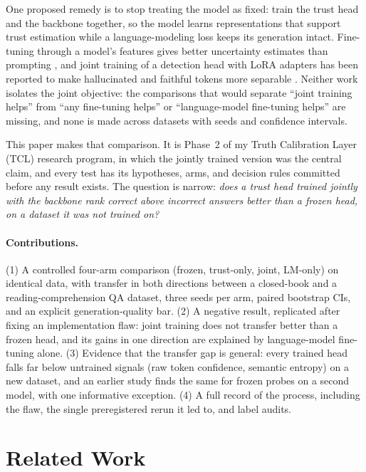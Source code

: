 \documentclass[11pt]{article}
\begin{document}
One proposed remedy is to stop treating the model as fixed: train the trust head and the backbone together, so the model learns representations that support trust estimation while a language-modeling loss keeps its generation intact. Fine-tuning through a model's features gives better uncertainty estimates than prompting \citep{kapoor2024large}, and joint training of a detection head with LoRA adapters has been reported to make hallucinated and faithful tokens more separable \citep{ridder2026ragognizer}. Neither work isolates the joint objective: the comparisons that would separate ``joint training helps'' from ``any fine-tuning helps'' or ``language-model fine-tuning helps'' are missing, and none is made across datasets with seeds and confidence intervals.

This paper makes that comparison. It is Phase~2 of my Truth Calibration Layer (TCL) research program, in which the jointly trained version was the central claim, and every test has its hypotheses, arms, and decision rules committed before any result exists. The question is narrow: \emph{does a trust head trained jointly with the backbone rank correct above incorrect answers better than a frozen head, on a dataset it was not trained on?}

\paragraph{Contributions.}
(1) A controlled four-arm comparison (frozen, trust-only, joint, LM-only) on identical data, with transfer in both directions between a closed-book and a reading-comprehension QA dataset, three seeds per arm, paired bootstrap CIs, and an explicit generation-quality bar.
(2) A negative result, replicated after fixing an implementation flaw: joint training does not transfer better than a frozen head, and its gains in one direction are explained by language-model fine-tuning alone.
(3) Evidence that the transfer gap is general: every trained head falls far below untrained signals (raw token confidence, semantic entropy) on a new dataset, and an earlier study finds the same for frozen probes on a second model, with one informative exception.
(4) A full record of the process, including the flaw, the single preregistered rerun it led to, and label audits.

\section{Related Work}
\end{document}

